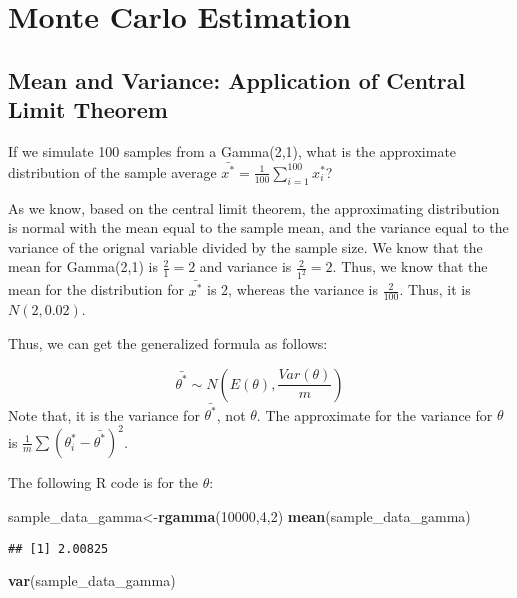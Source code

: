 \documentclass[
]{book}
\newenvironment{Shaded}{\begin{snugshade}}{\end{snugshade}}
\newcommand{\DecValTok}[1]{\textcolor[rgb]{0.00,0.00,0.81}{#1}}
\newcommand{\KeywordTok}[1]{\textcolor[rgb]{0.13,0.29,0.53}{\textbf{#1}}}
\newcommand{\NormalTok}[1]{#1}
\begin{document}
\hypertarget{monte-carlo-estimation}{%
\section{Monte Carlo Estimation}\label{monte-carlo-estimation}}

\hypertarget{mean-and-variance-application-of-central-limit-theorem}{%
\subsection{Mean and Variance: Application of Central Limit Theorem}\label{mean-and-variance-application-of-central-limit-theorem}}

If we simulate 100 samples from a Gamma(2,1), what is the approximate distribution of the sample average \(\bar{x^*}=\frac{1}{100} \sum_{i=1}^{100} x_i^*\)?

As we know, based on the central limit theorem, the approximating distribution is normal with the mean equal to the sample mean, and the variance equal to the variance of the orignal variable divided by the sample size. We know that the mean for Gamma(2,1) is \(\frac{2}{1}=2\) and variance is \(\frac{2}{1^2}=2\). Thus, we know that the mean for the distribution for \(\bar{x^*}\) is 2, whereas the variance is \(\frac{2}{100}\). Thus, it is \(N(2,0.02)\).

Thus, we can get the generalized formula as follows:

\[\bar{\theta^*} \sim N(E(\theta), \frac{Var(\theta)}{m})\]
Note that, it is the variance for \(\bar{\theta^*}\), not \(\theta\). The approximate for the variance for \(\theta\) is \(\frac{1}{m}\sum(\theta_i^*-\bar{\theta^*})^2\).

The following R code is for the \(\theta\):

\begin{Shaded}
\begin{Highlighting}[]
\NormalTok{sample_data_gamma<-}\KeywordTok{rgamma}\NormalTok{(}\DecValTok{10000}\NormalTok{,}\DecValTok{4}\NormalTok{,}\DecValTok{2}\NormalTok{)}
\KeywordTok{mean}\NormalTok{(sample_data_gamma)}
\end{Highlighting}
\end{Shaded}

\begin{verbatim}
## [1] 2.00825
\end{verbatim}

\begin{Shaded}
\begin{Highlighting}[]
\KeywordTok{var}\NormalTok{(sample_data_gamma)}
\end{Highlighting}
\end{Shaded}
\end{document}
